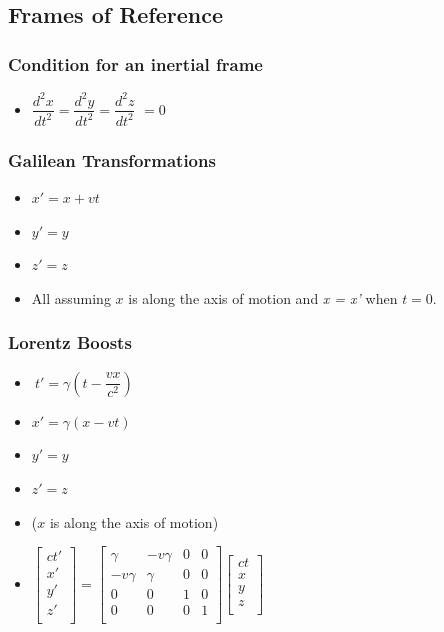 \documentclass[]{report}
\newcommand \tab[1][1cm]{\hspace*{#1}}
\newcommand{\itemt}{\item \tab}
\begin{document}
\subsection{Frames of Reference}		

\subsubsection{Condition for an inertial frame}	
\begin{itemize}
\itemt \( \dfrac{d^2 x}{dt^2} = \dfrac{d^2 y}{dt^2} = \dfrac{d^2 z}{dt^2} \) \normalsize \(= 0\)
\end{itemize}		 

\subsubsection[GT]{Galilean Transformations}				 
\begin{itemize}
\itemt \(x' = x + vt\)
\itemt \(y' = y\)
\itemt \(z' = z\)
\itemt All assuming $x$ is along the axis of motion and \textit{x = x'} when $t = 0$.	
\end{itemize}

\subsubsection{Lorentz Boosts}				
\begin{itemize}
\itemt \( \ t' = \gamma (t-\dfrac{vx}{c^2})\)
\itemt \( x' = \gamma (x-vt)\)
\itemt \( y' = y \)
\itemt \( z' = z \)
\itemt ($x$ is along the axis of motion)					
\itemt \(					
\begin{bmatrix}
ct' \\
x' \\
y' \\
z' \\
\end{bmatrix} =
\begin{bmatrix}
\gamma 		&-v\gamma	&0	&0 	\\
-v\gamma 	&\gamma		&0	&0	\\
0 			&0			&1	&0	\\
0 			&0			&0	&1	\\
\end{bmatrix}
\begin{bmatrix}
ct \\
x \\
y \\
z \\
\end{bmatrix} \)
\end{itemize}		
\end{document}
